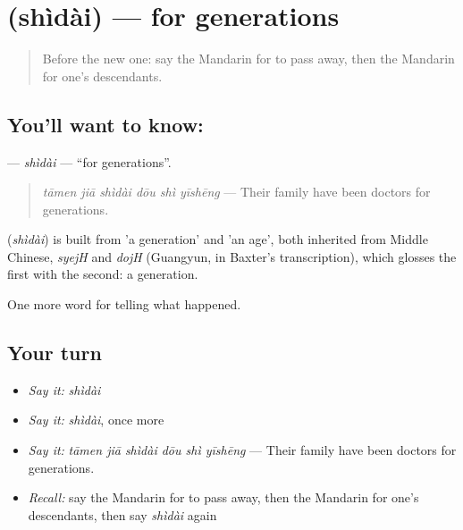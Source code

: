 \section[\texorpdfstring{\zh{世代} (shìdài)}{世代 (shìdài)}]{ (shìdài) — for generations}

\label{lesson:ZH-C325-shidai}



\begin{quote}
Before the new one: say the Mandarin for to pass away, then the Mandarin for one's descendants.
\end{quote}

\subsection*{You'll want to know: }
\textbf{} — \emph{shìdài} — \textquotedblleft{}for generations\textquotedblright{}.

\begin{quote}
\textbf{} \emph{tāmen jiā shìdài dōu shì yīshēng} — Their family have been doctors for generations.
\end{quote}

\begin{cousinweb}
\textbf{} (\emph{shìdài}) is built from  'a generation' and  'an age', both inherited from Middle Chinese, \emph{syejH} and \emph{dojH} (Guangyun, in Baxter's transcription), which glosses the first with the second: a generation.
\end{cousinweb}

\begin{grammarlens}[title={What you've built}]
One more word for telling what happened.
\end{grammarlens}

\subsection*{Your turn}
\begin{itemize}
\raggedright
  \item \emph{Say it:} \emph{shìdài}
  \item \emph{Say it:} \emph{shìdài}, once more
  \item \emph{Say it:} \emph{tāmen jiā shìdài dōu shì yīshēng} — Their family have been doctors for generations.
  \item \emph{Recall:} say the Mandarin for to pass away, then the Mandarin for one's descendants, then say \emph{shìdài} again
\end{itemize}

